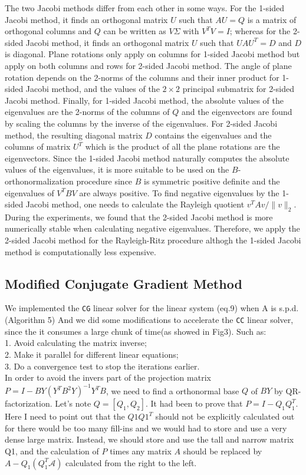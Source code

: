 The two Jacobi methods differ from each other in some ways. For the 1-sided Jacobi method, it finds an orthogonal
matrix $U$ such that $A U = Q$ is a matrix of orthogonal columns and $Q$ can be written as $V \Sigma$ with
$V^T V = I$; whereas for the 2-sided Jacobi method, it finds an orthogonal matrix $U$ such that $UAU^T = D$ and
$D$ is diagonal. Plane rotations only apply on columns for 1-sided Jacobi method but apply on both columns and rows
for 2-sided Jacobi method. The angle of plane rotation depends on the 2-norms of the columns and their inner
product for 1-sided Jacobi method, and the values of the $2 \times 2$ principal submatrix for 2-sided Jacobi method.
Finally, for 1-sided Jacobi method, the absolute values of the eigenvalues are the 2-norms of the columns of $Q$ and
the eigenvectors are found by scaling the columns by the inverse of the eigenvalues. For 2-sided Jacobi method, the
resulting diagonal matrix $D$ contains the eigenvalues and the columns of matrix $U^T$ which is the product of all
the plane rotations are the eigenvectors. Since the 1-sided Jacobi method naturally computes the absolute values of
the eigenvalues, it is more suitable to be used on the $B$-orthonormalization procedure since $B$ is symmetric
positive definite and the eigenvalues of $V^T B V$ are always positive. To find negative eigenvalues by the 1-sided
Jacobi method, one needs to calculate the Rayleigh quotient $v^T A v / \|v\|_2$. During the experiments, we found
that the 2-sided Jacobi method is more numerically stable when calculating negative eigenvalues. Therefore, we
apply the 2-sided Jacobi method for the Rayleigh-Ritz procedure althogh the 1-sided Jacobi method is computationally
less expensive.

\subsection{Modified Conjugate Gradient Method}
We implemented the {\tt CG} linear solver for the linear system (eq.9) when A is s.p.d.(Algorithm 5) And we did some modifications to accelerate the {\tt CC} linear solver, since the it consumes a large chunk of time(as showed in Fig3). Such as:\\1. Avoid calculating the matrix inverse;\\2. Make it parallel for different linear equations;\\3. Do a convergence test to stop the iterations earlier.\\


In order to avoid the invers part of the projection matrix $P=I-BY(Y^TB^2Y)^{-1}Y^TB$, we need to find a orthonormal base $Q$ of $BY$ by QR-factorization. Let's note $Q=[Q_1, Q_2]$. It had been to prove that $P=I-Q_1Q_1^T$. Here I need to point out that the $Q1Q1^T$ should not be explicitly calculated out for there would be too many fill-ins and we would had to store and use a very dense large  matrix. Instead, we should store and use the tall and narrow matrix Q1, and the calculation of $P$ times any matrix $A$ should be replaced by $A-Q_1(Q_1^T\mathcal{A})$ calculated from the right to the left.  


